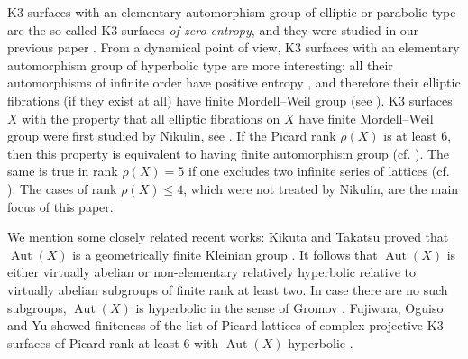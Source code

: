 \documentclass[11pt,letterpaper]{amsart}
\DeclareMathOperator{\Aut}{Aut}
\theoremstyle{definition}
\theoremstyle{remark}
\begin{document}
K3 surfaces with an elementary automorphism group of elliptic or parabolic type are the so-called K3 surfaces \emph{of zero entropy}, and they were studied in our previous paper \cite{brandhorst.mezzedimi}. From a dynamical point of view, K3 surfaces with an elementary automorphism group of hyperbolic type are more interesting: all their automorphisms of infinite order have positive entropy \cite[Theorem~5.5.8]{ratcliffe}, and therefore their elliptic fibrations (if they exist at all) have finite Mordell--Weil group (see ). K3 surfaces $X$ with the property that all elliptic fibrations on $X$ have finite Mordell--Weil group were first studied by Nikulin, see \cite[§3]{nikulin.elliptic}. If the Picard rank $\rho(X)$ is at least $6$, then this property is equivalent to having finite automorphism group (cf. \cite[Theorem~3.1]{nikulin.elliptic}). The same is true in rank $\rho(X)=5$ if one excludes two infinite series of lattices (cf. \cite[Theorem~3.2]{nikulin.elliptic}). The cases of rank $\rho(X)\le 4$, which were not treated by Nikulin, are the main focus of this paper.

We mention some closely related recent works: 
Kikuta and Takatsu proved that $\Aut(X)$ is a geometrically finite Kleinian group \cite{kikuta,takatsu}.
It follows that $\Aut(X)$ is either virtually abelian or non-elementary relatively hyperbolic relative to virtually abelian
subgroups of finite rank at least two. In case there are no such subgroups, $\Aut(X)$ is hyperbolic in the sense of Gromov \cite[Corollary 3.5]{fujiwara.oguiso.yu}.
Fujiwara, Oguiso and Yu showed finiteness of the list of Picard lattices of complex projective K3 surfaces of Picard rank at least $6$ with $\Aut(X)$ hyperbolic \cite{fujiwara.oguiso.yu}. 
\end{document}
